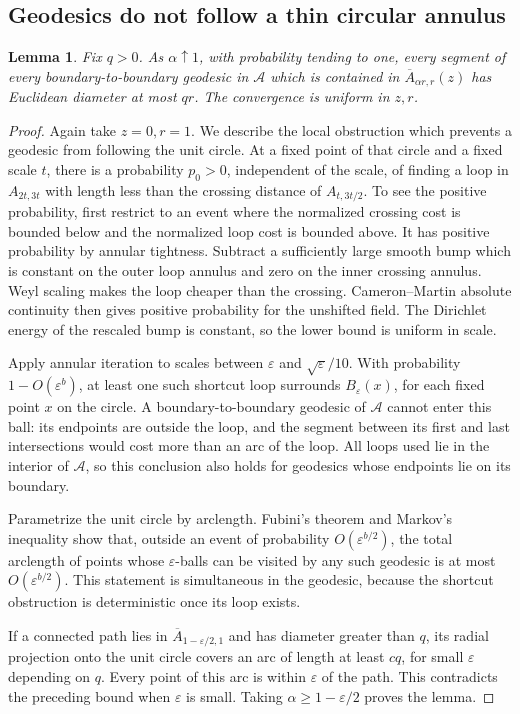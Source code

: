 \documentclass[11pt]{article}
\newtheorem{lemma}[theorem]{Lemma}
\theoremstyle{definition}
\theoremstyle{remark}
\newcommand{\eps}{\varepsilon}
\begin{document}
\subsection{Geodesics do not follow a thin circular annulus}
\begin{lemma}\label{lem:thin}
Fix $q>0$. As $\alpha\uparrow1$, with probability tending to one,
every segment of every boundary-to-boundary geodesic in
$\mathcal A$ which is contained in
$\overline A_{\alpha r,r}(z)$ has Euclidean diameter at most
$qr$. The convergence is uniform in $z,r$.
\end{lemma}
\begin{proof}
Again take $z=0,r=1$. We describe the local obstruction which
prevents a geodesic from following the unit circle. At a fixed
point of that circle and a fixed scale $t$, there is a probability
$p_0>0$, independent of the scale, of finding a loop in
$A_{2t,3t}$ with length less than the crossing distance of
$A_{t,3t/2}$. To see the positive probability, first restrict to
an event where the normalized crossing cost is bounded below
and the normalized loop cost is bounded above. It has positive
probability by annular tightness. Subtract a sufficiently large
smooth bump which is constant on the outer loop annulus and
zero on the inner crossing annulus. Weyl scaling makes the loop
cheaper than the crossing. Cameron--Martin absolute continuity
then gives positive probability for the unshifted field. The
Dirichlet energy of the rescaled bump is constant, so the lower
bound is uniform in scale.

Apply annular iteration to scales between $\eps$ and
$\sqrt\eps/10$. With probability $1-O(\eps^b)$, at least one
such shortcut loop surrounds $B_\eps(x)$, for each fixed point
$x$ on the circle. A boundary-to-boundary geodesic of
$\mathcal A$ cannot enter this ball: its endpoints are outside
the loop, and the segment between its first and last intersections
would cost more than an arc of the loop. All loops used lie in
the interior of $\mathcal A$, so this conclusion also holds for
geodesics whose endpoints lie on its boundary.

Parametrize the unit circle by arclength. Fubini's theorem and
Markov's inequality show that, outside an event of probability
$O(\eps^{b/2})$, the total arclength of points whose
$\eps$-balls can be visited by any such geodesic is at most
$O(\eps^{b/2})$. This statement is simultaneous in the
geodesic, because the shortcut obstruction is deterministic
once its loop exists.

If a connected path lies in $\overline A_{1-\eps/2,1}$ and has
diameter greater than $q$, its radial projection onto the unit
circle covers an arc of length at least $c q$, for small
$\eps$ depending on $q$. Every point of this arc is within
$\eps$ of the path. This contradicts the preceding bound when
$\eps$ is small. Taking $\alpha\ge1-\eps/2$ proves the lemma.
\end{proof}
\end{document}

